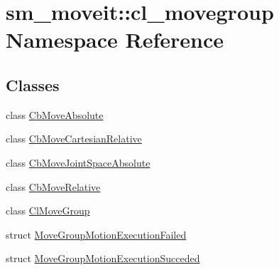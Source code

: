 \hypertarget{namespacesm__moveit_1_1cl__movegroup}{}\section{sm\+\_\+moveit\+:\+:cl\+\_\+movegroup Namespace Reference}
\label{namespacesm__moveit_1_1cl__movegroup}
\subsection*{Classes}
\begin{DoxyCompactItemize}
\item 
class \hyperlink{classsm__moveit_1_1cl__movegroup_1_1CbMoveAbsolute}{Cb\+Move\+Absolute}
\item 
class \hyperlink{classsm__moveit_1_1cl__movegroup_1_1CbMoveCartesianRelative}{Cb\+Move\+Cartesian\+Relative}
\item 
class \hyperlink{classsm__moveit_1_1cl__movegroup_1_1CbMoveJointSpaceAbsolute}{Cb\+Move\+Joint\+Space\+Absolute}
\item 
class \hyperlink{classsm__moveit_1_1cl__movegroup_1_1CbMoveRelative}{Cb\+Move\+Relative}
\item 
class \hyperlink{classsm__moveit_1_1cl__movegroup_1_1ClMoveGroup}{Cl\+Move\+Group}
\item 
struct \hyperlink{structsm__moveit_1_1cl__movegroup_1_1MoveGroupMotionExecutionFailed}{Move\+Group\+Motion\+Execution\+Failed}
\item 
struct \hyperlink{structsm__moveit_1_1cl__movegroup_1_1MoveGroupMotionExecutionSucceded}{Move\+Group\+Motion\+Execution\+Succeded}
\end{DoxyCompactItemize}
